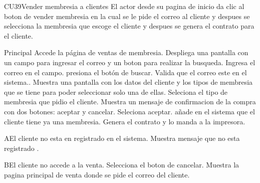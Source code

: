 


\begin{UseCase}{CU39}{Vender membresia a clientes}{
		El actor desde su pagina de inicio da clic al boton de vender membresia en la cual se le pide el correo al cliente y despues se selecciona la membresia que escoge el cliente y despues se genera el contrato para el cliente.}
\end{UseCase}

\begin{UCtrayectoria}{Principal}
	\UCpaso[\UCactor] Accede la página de ventas de membresia.
	\UCpaso Despliega una pantalla con un campo para ingresar el correo y un boton para realizar la busqueda.
	\UCpaso[\UCactor] Ingresa el correo en el campo.  
	\UCpaso[\UCactor] presiona el botón de buscar.
	\UCpaso Valida que el correo este en el sistema..
	\UCpaso Muestra una pantalla con los datos del cliente y los tipos de membresia que se tiene para poder seleccionar solo una de ellas.
	\UCpaso [\UCactor] Seleciona el tipo de membresia que pidio el cliente.
	\UCpaso Muestra un mensaje de confirmacion de la compra con dos botones: aceptar y cancelar.
	\UCpaso[\UCactor] Seleciona aceptar.
	\UCpaso añade en el sistema que el cliente tiene ya una membresia.
	\UCpaso Genera el contrato y lo manda a la impresora.
\end{UCtrayectoria}

		\begin{UCtrayectoriaA}{A}{El cliente no esta en registrado en el sistema.}
			\UCpaso Muestra mensaje que no esta registrado .
		\end{UCtrayectoriaA}
		\begin{UCtrayectoriaA}{B}{El cliente no accede a la venta.}
			\UCpaso[\UCactor] Selecciona el boton de cancelar.
			\UCpaso Muestra la pagina principal de venta donde se pide el correo del cliente.
		\end{UCtrayectoriaA}
		



